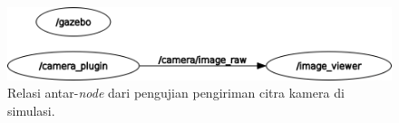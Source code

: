 
\begin{figure}[ht]
  \centering
  \includegraphics[scale=0.35]{gambar/rosgraph-camera-plugin.png}
  \caption{Relasi antar-\emph{node} dari pengujian pengiriman citra kamera di simulasi.}
  \label{fig:rosgraphcameraplugin}
\end{figure}






